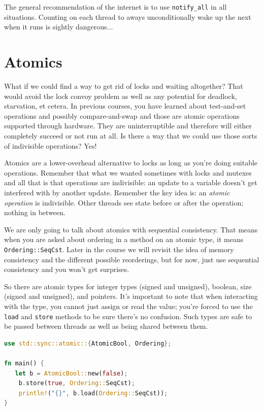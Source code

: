 \documentclass[a4paper]{report}
\begin{document}
The general recommendation of the internet is to use \texttt{notify\_all} in all situations. Counting on each thread to aways unconditionally wake up the next when it runs is sightly dangerous...

\section*{Atomics}
What if we could find a way to get rid of locks and waiting altogether? That would avoid the lock convoy problem as well as any potential for deadlock, starvation, et cetera. In previous courses, you have learned about test-and-set operations and possibly compare-and-swap and those are atomic operations supported through hardware. They are uninterruptible and therefore will either completely succeed or not run at all. Is there a way that we could use those sorts of indivisible operations? Yes!

Atomics are a lower-overhead alternative to
locks as long as you're doing suitable operations. Remember that what we wanted sometimes with locks and mutexes and all that is that operations are indivisible: an update to a variable doesn't get interfered with by another update. Remember the key idea is: an \textit{atomic operation} is indivisible. Other threads see state before or after the operation; nothing in between.

We are only going to talk about atomics with sequential consistency. That means when you are asked about ordering in a method on an atomic type, it means \texttt{Ordering::SeqCst}. Later in the course we will revisit the idea of memory consistency and the different possible reorderings, but for now, just use sequential consistency and you won't get surprises.

So there are atomic types for integer types (signed and unsigned), boolean, size (signed and unsigned), and pointers. It's important to note that when interacting with the type, you cannot just assign or read the value; you're forced to use the \texttt{load} and \texttt{store} methods to be sure there's no confusion. Such types are safe to be passed between threads as well as being shared between them. 

\begin{lstlisting}[language=Rust]
use std::sync::atomic::{AtomicBool, Ordering};

fn main() {
   let b = AtomicBool::new(false);
    b.store(true, Ordering::SeqCst);
    println!("{}", b.load(Ordering::SeqCst));
}
\end{lstlisting}
\end{document}
